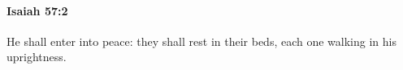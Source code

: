 
		\paragraph{Isaiah 57:2} %
			\label{ISAIAH-57-2}

			He shall enter into peace: they shall rest in their beds, each one walking in his uprightness.



